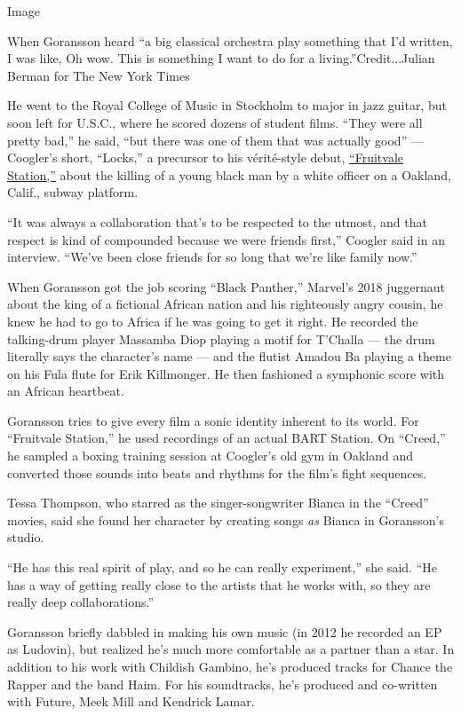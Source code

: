 Image

When Goransson heard ``a big classical orchestra play something that I'd
written, I was like, Oh wow. This is something I want to do for a
living.''Credit...Julian Berman for The New York Times

He went to the Royal College of Music in Stockholm to major in jazz
guitar, but soon left for U.S.C., where he scored dozens of student
films. ``They were all pretty bad,'' he said, ``but there was one of
them that was actually good'' --- Coogler's short, ``Locks,'' a
precursor to his vérité-style debut,
\href{https://www.nytimes3xbfgragh.onion/2013/07/12/movies/fruitvale-station-is-based-on-the-story-of-oscar-grant-iii.html}{``Fruitvale
Station,''} about the killing of a young black man by a white officer on
a Oakland, Calif., subway platform.

``It was always a collaboration that's to be respected to the utmost,
and that respect is kind of compounded because we were friends first,''
Coogler said in an interview. ``We've been close friends for so long
that we're like family now.''

When Goransson got the job scoring ``Black Panther,'' Marvel's 2018
juggernaut about the king of a fictional African nation and his
righteously angry cousin, he knew he had to go to Africa if he was going
to get it right. He recorded the talking-drum player Massamba Diop
playing a motif for T'Challa --- the drum literally says the character's
name --- and the flutist Amadou Ba playing a theme on his Fula flute for
Erik Killmonger. He then fashioned a symphonic score with an African
heartbeat.

Goransson tries to give every film a sonic identity inherent to its
world. For ``Fruitvale Station,'' he used recordings of an actual BART
Station. On ``Creed,'' he sampled a boxing training session at Coogler's
old gym in Oakland and converted those sounds into beats and rhythms for
the film's fight sequences.

Tessa Thompson, who starred as the singer-songwriter Bianca in the
``Creed'' movies, said she found her character by creating songs
\emph{as} Bianca in Goransson's studio.

``He has this real spirit of play, and so he can really experiment,''
she said. ``He has a way of getting really close to the artists that he
works with, so they are really deep collaborations.''

Goransson briefly dabbled in making his own music (in 2012 he recorded
an EP as Ludovin), but realized he's much more comfortable as a partner
than a star. In addition to his work with Childish Gambino, he's
produced tracks for Chance the Rapper and the band Haim. For his
soundtracks, he's produced and co-written with Future, Meek Mill and
Kendrick Lamar.

